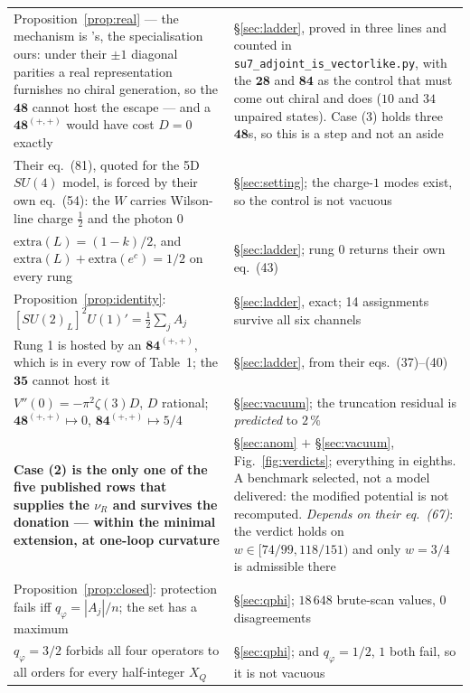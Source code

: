 \documentclass[11pt,a4paper]{article}
\newcommand{\su}[1]{SU(#1)}
\newcommand{\rep}[1]{\mathbf{#1}}
\begin{document}
\begin{longtable}{p{}p{}}
\rowcolor{amber!12}Proposition~\ref{prop:real} --- the mechanism is \cite{GMN}'s, the specialisation
ours: under their $\pm1$ diagonal parities a real representation furnishes no chiral generation, so
the $\rep{48}$ cannot host the escape --- and a $\rep{48}^{(+,+)}$ would have cost
$D=0$ exactly & \S\ref{sec:ladder}, proved in three lines and counted in
\texttt{su7\_adjoint\_is\_vectorlike.py}, with the $\rep{28}$ and
$\rep{84}$ as the control that must come out chiral and does ($10$ and $34$ unpaired states). Case
(3) holds three $\rep{48}$s, so this is a step and not an aside\\
Their eq.~(81), quoted for the 5D $\su4$ model, is forced by their own eq.~(54): the $W$ carries
Wilson-line charge $\tfrac12$ and the photon $0$ & \S\ref{sec:setting}; the charge-$1$ modes exist,
so the control is not vacuous\\
$\mathrm{extra}(L)=(1-k)/2$, and $\mathrm{extra}(L)+\mathrm{extra}(e^c)=1/2$ on every rung &
\S\ref{sec:ladder}; rung 0 returns their own eq.~(43)\\
Proposition~\ref{prop:identity}: $[\su2_L]^2U(1)'=\tfrac12\sum_jA_j$ & \S\ref{sec:ladder}, exact;
14 assignments survive all six channels\\
Rung 1 is hosted by an $\rep{84}^{(+,+)}$, which is in every row of Table~1; the $\rep{35}$ cannot
host it & \S\ref{sec:ladder}, from their eqs.~(37)--(40)\\
$V''(0)=-\pi^2\zeta(3)D$, $D$ rational; $\rep{48}^{(+,+)}\mapsto0$, $\rep{84}^{(+,+)}\mapsto5/4$ &
\S\ref{sec:vacuum}; the truncation residual is \emph{predicted} to $2\,\%$\\
\rowcolor{amber!12}\textbf{Case (2) is the only one of the five published rows that supplies the
$\nu_R$ and survives the donation --- within the minimal extension, at one-loop curvature} &
\S\ref{sec:anom} $+$ \S\ref{sec:vacuum}, Fig.~\ref{fig:verdicts}; everything in eighths. A benchmark
selected, not a model delivered: the modified potential is not recomputed. \emph{Depends on their
eq.~(67)}: the verdict holds on $w\in[74/99,118/151)$ and only $w=3/4$ is admissible there\\
Proposition~\ref{prop:closed}: protection fails iff $q_\varphi=|A_j|/n$; the set has a maximum &
\S\ref{sec:qphi}; $18\,648$ brute-scan values, $0$ disagreements\\
$q_\varphi=3/2$ forbids all four operators to all orders for every half-integer $X_Q$ &
\S\ref{sec:qphi}; and $q_\varphi=1/2$, $1$ both fail, so it is not vacuous\\

\end{longtable}
\end{document}
